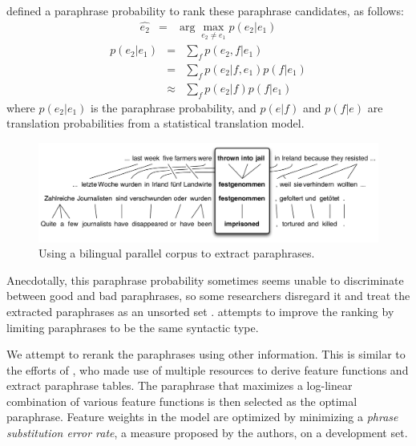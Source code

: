 \documentclass[11pt]{article}
\begin{document}
 defined a paraphrase probability to rank these paraphrase candidates,  as follows:
\begin{eqnarray} 
 \hat{e_2}	& = & \arg \max_{e_2 \neq e_1} p(e_2 | e_1)\label{paraphrase-prob}  
\end{eqnarray}
\begin{eqnarray} 
  p(e_2|e_1) &=& \sum_f p(e_2,f|e_1)\\
                  &=& \sum_f p(e_2|f,e_1) p(f|e_1) \\
                  &\approx& \sum_f p(e_2|f) p(f|e_1)
\label{paraphrase_prob_eqn}
\end{eqnarray}
where ${p(e_2|e_1)}$ is the paraphrase probability, and ${p(e|f)}$ and ${p(f|e)}$ are translation probabilities from a statistical translation model.  


\begin{figure}
\begin{center}
\includegraphics[width=\linewidth]{pivot-2}
\end{center}
\caption{\small Using a bilingual parallel corpus to extract paraphrases.}
\label{paraphrase-illustration}
\end{figure}

Anecdotally, this paraphrase probability sometimes seems unable to discriminate between good and bad paraphrases, so some researchers disregard it and treat the extracted paraphrases as an unsorted set \cite{Snover2010}.   attempts to improve the ranking by limiting paraphrases to be the same syntactic type.  

We attempt to rerank the paraphrases using other information. This is similar to the efforts of , who made use of multiple resources %
to derive feature functions and extract paraphrase tables. The paraphrase that maximizes a log-linear combination of various feature functions is then selected as the optimal paraphrase. Feature weights in the model are optimized by minimizing a {\it phrase substitution error rate}, a measure proposed by the authors, on a development set.
\end{document}
